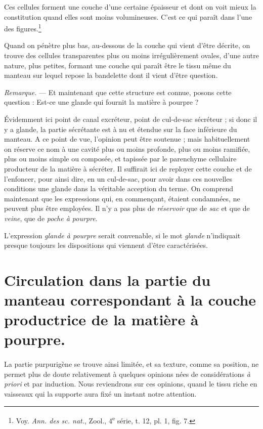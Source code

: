\documentclass[a4paper, 11pt, oneside, polutonikogreek, french]{article}
\begin{document}
Ces cellules forment une couche d'une certaine épaisseur et dont on voit mieux la constitution quand elles sont moins volumineuses. C'est ce qui paraît dans l'une des figures.\footnote{Voy. \emph{Ann. des sc. nat.}, Zool., 4\textsuperscript{e} série, t. 12, pl. 1, fig. 7.}

Quand on pénètre plus bas, au-dessous de la couche qui vient d'être décrite, on trouve des cellules transparentes plus ou moins irrégulièrement ovales, d'une autre nature, plus petites, formant une couche qui paraît être le tissu même du manteau sur lequel repose la bandelette dont il vient d'être question.

\emph{Remarque.} --- Et maintenant que cette structure est connue, posons cette question : Est-ce une glande qui fournit la matière à pourpre ?

Évidemment ici point de canal excréteur, point de cul-de-sac sécréteur ; si donc il y a glande, la partie sécrétante est à nu et étendue sur la face inférieure du manteau. A ce point de vue, l'opinion peut être soutenue ; mais habituellement on réserve ce nom à une cavité plus ou moins profonde, plus ou moins ramifiée, plus ou moins simple ou composée, et tapissée par le parenchyme cellulaire producteur de la matière à sécréter. Il suffirait ici de reployer cette couche et de l'enfoncer, pour ainsi dire, en un cul-de-sac, pour avoir dans ces nouvelles conditions une glande dans la véritable acception du terme. On comprend maintenant que les expressions qui, en commençant, étaient condamnées, ne peuvent plus être employées. Il n'y a pas plus de \emph{réservoir} que de \emph{sac} et que de \emph{veine}, que de \emph{poche à pourpre}.

L'expression \emph{glande à pourpre} serait convenable, si le mot \emph{glande} n'indiquait presque toujours les dispositions qui viennent d'être caractérisées.
\clearpage
\section{Circulation dans la partie du manteau correspondant à la couche productrice de la matière à pourpre.}
\paragraph{}
La partie purpurigène se trouve ainsi limitée, et sa texture, comme sa position, ne permet plus de doute relativement à quelques opinions nées de considérations \emph{à priori} et par induction. Nous reviendrons sur ces opinions, quand le tissu riche en vaisseaux qui la supporte aura fixé un instant notre attention.
\end{document}
